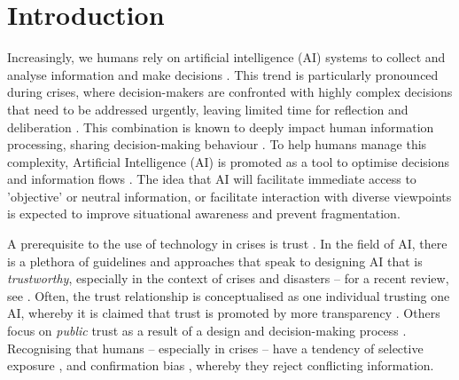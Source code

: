 \documentclass[pdflatex,sn-apa]{sn-jnl}%
\begin{document}


\maketitle

\section{Introduction}\label{sec1}
Increasingly, we humans rely on artificial intelligence (AI) systems to collect and analyse information and make decisions \citep{klingbeil2024trust}. This trend is particularly pronounced during crises, where decision-makers are confronted with highly complex decisions that need to be addressed urgently, leaving limited time for reflection and deliberation \citep{mendonca2001decision}. This combination is known to deeply impact human information processing, sharing decision-making behaviour \citep{comes2020coordination}. To help humans manage this complexity, Artificial Intelligence (AI) is promoted as a tool to optimise decisions and information flows \citep{jeon2024hearhere}. The idea that AI will facilitate immediate access to 'objective' or neutral information, or facilitate interaction with diverse viewpoints is expected to improve situational awareness and prevent fragmentation. 

A prerequisite to the use of technology in crises is trust \citep{steinbrink2024impact}. In the field of AI, there is a plethora of guidelines and approaches that speak to designing AI that is \textit{trustworthy}, especially in the context of crises and disasters -- for a recent review, see \citep{albahri2024systematic}. Often, the trust relationship is conceptualised as one individual trusting one AI, whereby it is claimed that trust is promoted by more transparency \citep{visave2025transparency}. Others focus on \textit{public} trust as a result of a design and decision-making process \citep{tzachor2020artificial}. Recognising that humans -- especially in crises -- have a tendency of selective exposure \citep{barbera2015tweeting}, and confirmation bias \citep{paulus2024interplay}, whereby they reject conflicting information. 
\end{document}
